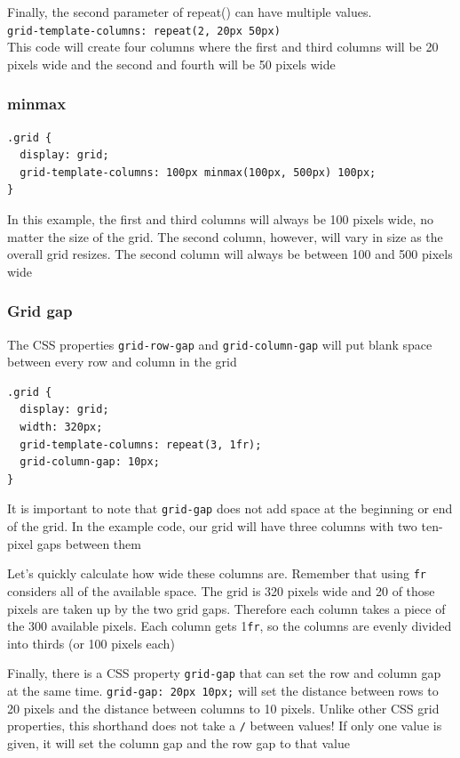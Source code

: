 \documentclass[a4paper, 12pt]{article}
\begin{document}
Finally, the second parameter of repeat() can have multiple values.\\
\verb|grid-template-columns: repeat(2, 20px 50px)|\\
This code will create four columns where the first and third columns will be 20 pixels wide and the second and fourth will be 50 pixels wide

\subsubsection{minmax}
\begin{verbatim}
.grid {
  display: grid;
  grid-template-columns: 100px minmax(100px, 500px) 100px;
}
\end{verbatim}

In this example, the first and third columns will always be 100 pixels wide, no matter the size of the grid. The second column, however, will vary in size as the overall grid resizes. The second column will always be between 100 and 500 pixels wide

\subsubsection{Grid gap}
The CSS properties \verb|grid-row-gap| and \verb|grid-column-gap| will put blank space between every row and column in the grid
\begin{verbatim}
.grid { 
  display: grid; 
  width: 320px; 
  grid-template-columns: repeat(3, 1fr); 
  grid-column-gap: 10px; 
}
\end{verbatim}

It is important to note that \verb|grid-gap| does not add space at the beginning or end of the grid. In the example code, our grid will have three columns with two ten-pixel gaps between them

Let's quickly calculate how wide these columns are. Remember that using \verb|fr| considers all of the available space. The grid is 320 pixels wide and 20 of those pixels are taken up by the two grid gaps. Therefore each column takes a piece of the 300 available pixels. Each column gets 1\verb|fr|, so the columns are evenly divided into thirds (or 100 pixels each)

Finally, there is a CSS property \verb|grid-gap| that can set the row and column gap at the same time. \verb|grid-gap: 20px 10px;| will set the distance between rows to 20 pixels and the distance between columns to 10 pixels. Unlike other CSS grid properties, this shorthand does not take a \verb|/| between values! If only one value is given, it will set the column gap and the row gap to that value
\end{document}
